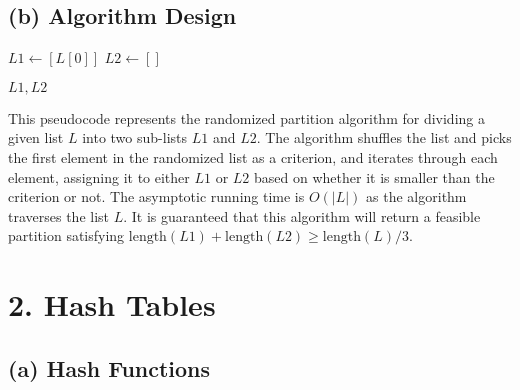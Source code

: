 \documentclass[10pt]{article}
\begin{document}
\subsection*{(b) Algorithm Design}

\begin{algorithmic}
  \State {}
  \State $L1 \gets [L[0]]$
  \State $L2 \gets []$

  \State {}
  \Else
  \State {}
  \EndIf
  \EndFor

  \State \Return $L1, L2$
  \EndFunction
\end{algorithmic}

This pseudocode represents the randomized partition algorithm for dividing a given list $L$ into two sub-lists $L1$ and $L2$. The algorithm shuffles the list and picks the first element in the randomized list as a criterion, and iterates through each element, assigning it to either $L1$ or $L2$ based on whether it is smaller than the criterion or not. The asymptotic running time is $O(|L|)$ as the algorithm traverses the list $L$.  It is guaranteed that this algorithm will return a feasible partition satisfying $\text{length}(L1) + \text{length}(L2) \geq \text{length}(L) / 3$.

\section*{2. Hash Tables}

\subsection*{(a) Hash Functions}
\end{document}
